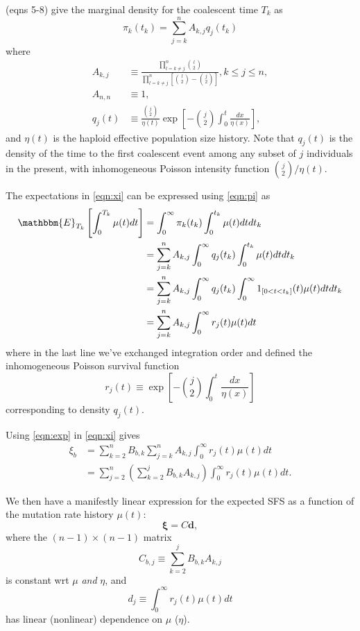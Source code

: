 \documentclass[11pt]{article}
\begin{document}
\cite{Polanski2003-kg} (eqns 5-8) give the marginal density for the coalescent time $T_k$ as
\begin{equation}
\label{eqn:pi}
\pi_k(t_k) = \sum_{j=k}^n A_{k,j} q_j(t_k)
\end{equation}
where
\begin{align*}
A_{k,j} &\equiv \frac{\prod_{l=k\ne j}^{n}\binom{l}{2}}{\prod_{l=k\ne j}^{n}\left[\binom{l}{2}-\binom{j}{2}\right]}, k\le j\le n,\\
A_{n,n} &\equiv 1,\\
q_j(t) &\equiv \frac{\binom{j}{2}}{\eta(t)}\exp\left[-\binom{j}{2}\int_0^t\frac{dx}{\eta(x)}\right],
\end{align*}
and $\eta(t)$ is the haploid effective population size history.
Note that $q_j(t)$ is the density of the time to the first coalescent event among any subset of $j$ individuals in the present, with inhomogeneous Poisson intensity function $\binom{j}{2}/\eta(t)$.

The expectations in \eqref{eqn:xi} can be expressed using \eqref{eqn:pi} as
\begin{align}
\label{eqn:exp}
\mathbbm{E}_{T_k}\left[\int_0^{T_k}\mu(t)dt\right] &= \int_0^\infty\pi_k(t_k)\int_0^{t_k}\mu(t)dt dt_k\nonumber\\
&= \sum_{j=k}^n A_{k,j}\int_0^\infty q_j(t_k)\int_0^{t_k}\mu(t)dt dt_k\nonumber\\
&= \sum_{j=k}^n A_{k,j}\int_0^\infty q_j(t_k)\int_0^\infty 1_{[0<t<t_k]}(t)\mu(t)dt dt_k\nonumber\\
&= \sum_{j=k}^n A_{k,j}\int_0^\infty r_j(t)\mu(t)dt
\end{align}
where in the last line we've exchanged integration order and defined the inhomogeneous Poisson survival function
\begin{equation}
\label{eqn:r}
r_j(t) \equiv \exp\left[-\binom{j}{2}\int_0^t\frac{dx}{\eta(x)}\right]
\end{equation}
corresponding to density $q_j(t)$.

Using \eqref{eqn:exp} in \eqref{eqn:xi} gives
\begin{align}
\label{eqn:xi2}
\xi_b &= \sum_{k=2}^n B_{b,k} \sum_{j=k}^n A_{k,j}\int_0^\infty r_j(t)\mu(t)dt\nonumber\\
&= \sum_{j=2}^n \left(\sum_{k=2}^j B_{b,k} A_{k,j}\right) \int_0^\infty r_j(t)\mu(t)dt.
\end{align}

We then have a manifestly linear expression for the expected SFS as a function of the mutation rate history $\mu(t)$:
\begin{equation}
\label{eqn:xivec}
\boldsymbol\xi = C \boldsymbol d,
\end{equation}
where the $(n-1)\times(n-1)$ matrix
\[
C_{b,j} \equiv \sum_{k=2}^j B_{b,k} A_{k,j}
\]
is constant wrt $\mu$ \emph{and} $\eta$, and
\begin{equation}
\label{eqn:d}
d_j \equiv \int_0^\infty r_j(t)\mu(t)dt
\end{equation}
has linear (nonlinear) dependence on $\mu$ ($\eta$).
\end{document}
